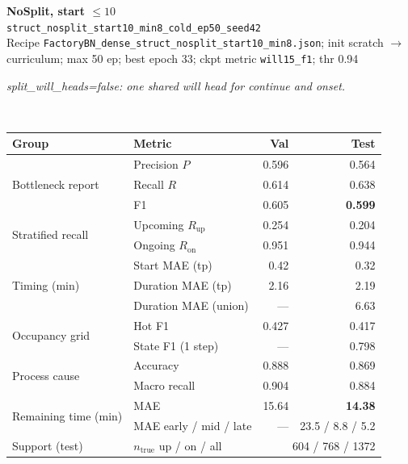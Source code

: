 \documentclass[9pt,a4paper,twocolumn]{extarticle}
\begin{document}
\noindent\begin{minipage}{\columnwidth}
\begin{center}
{\small\bfseries NoSplit, start $\le 10$}\\
{\scriptsize\texttt{struct\_nosplit\_start10\_min8\_cold\_ep50\_seed42}}\\
{\scriptsize Recipe \texttt{FactoryBN\_dense\_struct\_nosplit\_start10\_min8.json}; init scratch $\to$ curriculum; max 50 ep; best epoch 33; ckpt metric \texttt{will15\_f1}; thr 0.94}\\[1pt]
\parbox{0.96\columnwidth}{\scriptsize\itshape split\_will\_heads=false: one shared will head for continue and onset.}\\[2pt]
\scriptsize\setlength{\tabcolsep}{3pt}
\begin{tabular}{llrr}
\toprule
Group & Metric & Val & Test \\
\midrule
\multirow{3}{*}{Bottleneck report}
  & Precision $P$ & 0.596 & 0.564 \\
  & Recall $R$ & 0.614 & 0.638 \\
  & F1 & 0.605 & \textbf{0.599} \\
\midrule
\multirow{2}{*}{Stratified recall}
  & Upcoming $R_{\mathrm{up}}$ & 0.254 & 0.204 \\
  & Ongoing $R_{\mathrm{on}}$ & 0.951 & 0.944 \\
\midrule
\multirow{3}{*}{Timing (min)}
  & Start MAE (tp) & 0.42 & 0.32 \\
  & Duration MAE (tp) & 2.16 & 2.19 \\
  & Duration MAE (union) & --- & 6.63 \\
\midrule
\multirow{2}{*}{Occupancy grid}
  & Hot F1 & 0.427 & 0.417 \\
  & State F1 (1 step) & --- & 0.798 \\
\midrule
\multirow{2}{*}{Process cause}
  & Accuracy & 0.888 & 0.869 \\
  & Macro recall & 0.904 & 0.884 \\
\midrule
\multirow{2}{*}{Remaining time (min)}
  & MAE & 15.64 & \textbf{14.38} \\
  & MAE early / mid / late & --- & 23.5 / 8.8 / 5.2 \\
\midrule
Support (test)
  & $n_{\mathrm{true}}$ up / on / all & \multicolumn{2}{r}{604 / 768 / 1372} \\
\bottomrule
\end{tabular}
\end{center}
\end{minipage}\par\vspace{6pt}
\end{document}
